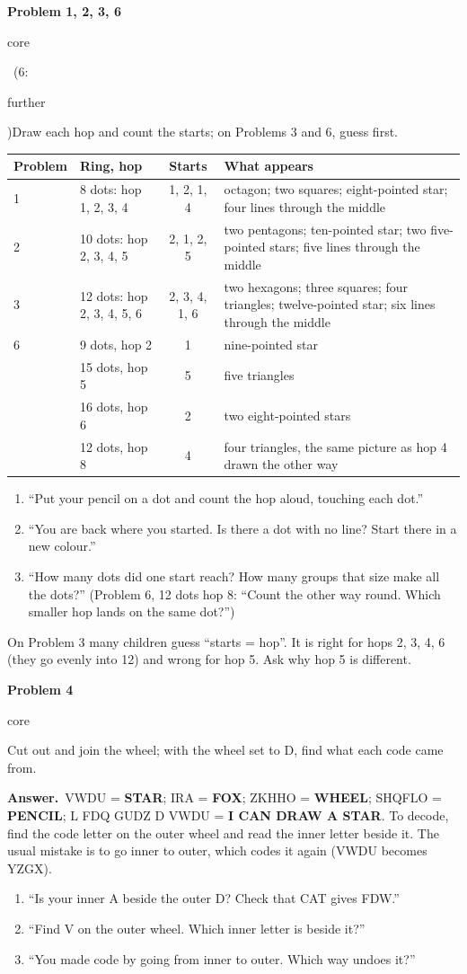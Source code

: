\documentclass[11pt]{article}
\newcommand{\lbl}[1]{\colorbox{black!10}{\footnotesize\strut #1}}
\newcommand{\core}{\lbl{core}}
\newcommand{\further}{\lbl{further}}
\newcommand{\pb}[3]{\par\needspace{4\baselineskip}\vspace{3pt}\noindent\textbf{Problem #1}\enspace #2\enspace #3\par}
\newcommand{\ans}{\textbf{Answer.}\ }
\newenvironment{hints}{\begin{enumerate}[label={\textit{Hint \arabic*.}}, leftmargin=*, align=left]}{\end{enumerate}}
\begin{document}
\pb{1, 2, 3, 6}{\core\ (6: \further)}{Draw each hop and count the starts; on Problems 3 and 6, guess first.}

{\small\begin{tabularx}{\textwidth}{@{}l l c L@{}}
\toprule
Problem & Ring, hop & Starts & What appears \\
 & 8 dots: hop 1, 2, 3, 4 & 1, 2, 1, 4 & octagon; two squares; eight-pointed star; four lines through the middle \\
2 & 10 dots: hop 2, 3, 4, 5 & 2, 1, 2, 5 & two pentagons; ten-pointed star; two five-pointed stars; five lines through the middle \\
3 & 12 dots: hop 2, 3, 4, 5, 6 & 2, 3, 4, 1, 6 & two hexagons; three squares; four triangles; twelve-pointed star; six lines through the middle \\
6 & 9 dots, hop 2 & 1 & nine-pointed star \\
  & 15 dots, hop 5 & 5 & five triangles \\
  & 16 dots, hop 6 & 2 & two eight-pointed stars \\
  & 12 dots, hop 8 & 4 & four triangles, the same picture as hop 4 drawn the other way \\
\bottomrule
\end{tabularx}}
\begin{hints}
\item ``Put your pencil on a dot and count the hop aloud, touching each dot.''
\item ``You are back where you started. Is there a dot with no line? Start there in a new colour.''
\item ``How many dots did one start reach? How many groups that size make all the dots?'' (Problem 6, 12 dots
  hop 8: ``Count the other way round. Which smaller hop lands on the same dot?'')
\end{hints}
On Problem 3 many children guess ``starts = hop''. It is right for hops 2, 3, 4, 6 (they go evenly into 12) and
wrong for hop 5. Ask why hop 5 is different.

\pb{4}{\core}{Cut out and join the wheel; with the wheel set to D, find what each code came from.}
\ans VWDU = \textbf{STAR}; IRA = \textbf{FOX}; ZKHHO = \textbf{WHEEL}; SHQFLO = \textbf{PENCIL};
L FDQ GUDZ D VWDU = \textbf{I CAN DRAW A STAR}. To decode, find the code letter on the outer wheel and read the
inner letter beside it. The usual mistake is to go inner to outer, which codes it again (VWDU becomes YZGX).
\begin{hints}
\item ``Is your inner A beside the outer D? Check that CAT gives FDW.''
\item ``Find V on the outer wheel. Which inner letter is beside it?''
\item ``You made code by going from inner to outer. Which way undoes it?''
\end{hints}
\end{document}

